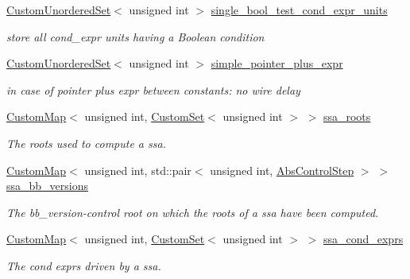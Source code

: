 \begin{DoxyCompactItemize}
\hyperlink{classCustomUnorderedSet}{Custom\+Unordered\+Set}$<$ unsigned int $>$ \hyperlink{classAllocationInformation_a61e9c863f269931e338ac07d5f734207}{single\+\_\+bool\+\_\+test\+\_\+cond\+\_\+expr\+\_\+units}
\begin{DoxyCompactList}\small\item\em store all cond\+\_\+expr units having a Boolean condition \end{DoxyCompactList}\item 
\hyperlink{classCustomUnorderedSet}{Custom\+Unordered\+Set}$<$ unsigned int $>$ \hyperlink{classAllocationInformation_a2d8c8212a7c90f4c513fbb768fc7a1f9}{simple\+\_\+pointer\+\_\+plus\+\_\+expr}
\begin{DoxyCompactList}\small\item\em in case of pointer plus expr between constants\+: no wire delay \end{DoxyCompactList}\item 
\hyperlink{custom__map_8hpp_a18ca01763abbe3e5623223bfe5aaac6b}{Custom\+Map}$<$ unsigned int, \hyperlink{custom__set_8hpp_a615bc2f42fc38a4bb1790d12c759e86f}{Custom\+Set}$<$ unsigned int $>$ $>$ \hyperlink{classAllocationInformation_a0dd5083f4469a235b905714b082d1d75}{ssa\+\_\+roots}
\begin{DoxyCompactList}\small\item\em The roots used to compute a ssa. \end{DoxyCompactList}\item 
\hyperlink{custom__map_8hpp_a18ca01763abbe3e5623223bfe5aaac6b}{Custom\+Map}$<$ unsigned int, std\+::pair$<$ unsigned int, \hyperlink{structAbsControlStep}{Abs\+Control\+Step} $>$ $>$ \hyperlink{classAllocationInformation_aef0739940e0bcfbb061eff338beb3444}{ssa\+\_\+bb\+\_\+versions}
\begin{DoxyCompactList}\small\item\em The bb\+\_\+version-\/control root on which the roots of a ssa have been computed. \end{DoxyCompactList}\item 
\hyperlink{custom__map_8hpp_a18ca01763abbe3e5623223bfe5aaac6b}{Custom\+Map}$<$ unsigned int, \hyperlink{custom__set_8hpp_a615bc2f42fc38a4bb1790d12c759e86f}{Custom\+Set}$<$ unsigned int $>$ $>$ \hyperlink{classAllocationInformation_a712d53b3d241f270b98d8b0b96cb6122}{ssa\+\_\+cond\+\_\+exprs}
\begin{DoxyCompactList}\small\item\em The cond exprs driven by a ssa. \end{DoxyCompactList}\item 

\end{DoxyCompactItemize}
